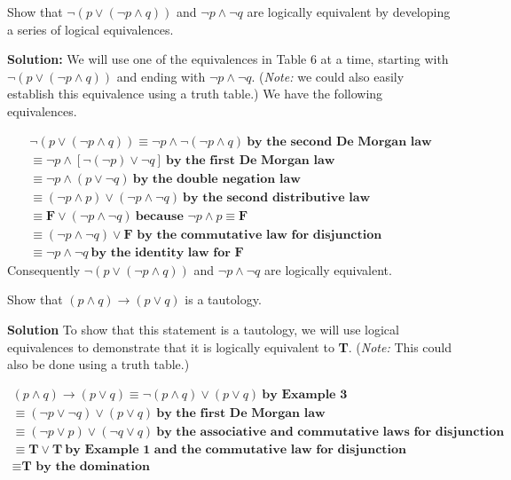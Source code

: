 \documentclass{Axon}
\begin{document}
\begin{example}
    Show that \(\lnot (p \lor (\lnot p \land q))\) and \(\lnot p \land \lnot q\) are logically equivalent by developing a series of logical equivalences.

    \noindent
    \textbf{Solution:}
    We will use one of the equivalences in Table 6 at a time, starting with \(\lnot (p \lor (\lnot p \land q))\) and ending with \(\lnot p \land \lnot q\). (\textit{Note:} we could also easily establish this equivalence using a truth table.) We have the following equivalences.

    \begin{gather*}
        \lnot (p \lor (\lnot p \land q)) \equiv \lnot p \land \lnot (\lnot p \land q) \ \textbf{by the second De Morgan law} \\
        \equiv \lnot p \land [\lnot(\lnot p) \lor \lnot q] \ \textbf{by the first De Morgan law} \\
        \equiv \lnot p \land (p \lor \lnot q) \ \textbf{by the double negation law} \\
        \equiv (\lnot p \land p) \lor (\lnot p \land \lnot q) \ \textbf{by the second distributive law} \\
        \equiv \textbf{F} \lor (\lnot p \land \lnot q) \ \textbf{because } \lnot p \land p \equiv \textbf{F} \\
        \equiv (\lnot p \land \lnot q) \lor \textbf{F by the commutative law for disjunction} \\
        \equiv \lnot p \land \lnot q \ \textbf{by the identity law for F}
    \end{gather*}
    Consequently \(\lnot (p \lor (\lnot p \land q))\) and \(\lnot p \land \lnot q\) are logically equivalent.
\end{example}

\begin{example}\label{Example: 8}
    Show that \((p \land q) \to (p \lor q)\) is a tautology.

    \noindent
    \textbf{Solution}
    To show that this statement is a tautology, we will use logical equivalences to demonstrate that it is logically equivalent to \textbf{T}. (\textit{Note:} This could also be done using a truth table.)

    \begin{gather*}
        (p \land q) \to (p \lor q) \equiv \lnot(p \land q) \lor (p \lor q) \ \textbf{by Example 3} \\
        \equiv (\lnot p \lor \lnot q) \lor (p \lor q) \ \textbf{by the first De Morgan law} \\
        \equiv (\lnot p \lor p) \lor (\lnot q \lor q) \ \textbf{by the associative and commutative laws for disjunction} \\
        \equiv \textbf{T} \lor \textbf{T} \ \textbf{by Example 1 and the commutative law for disjunction} \\
        \equiv \textbf{T by the domination}
    \end{gather*}
\end{example}

\printbibliography
\end{document}
